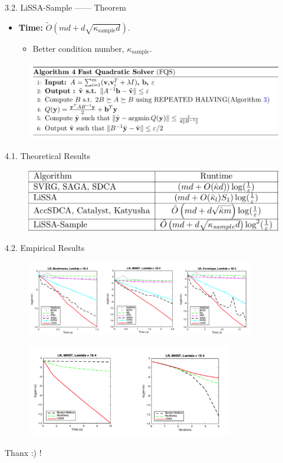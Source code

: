 \documentclass[pdf]{beamer}
\theoremstyle{remark}
\theoremstyle{definition}
\begin{document}
\begin{frame}{3.2. LiSSA-Sample —— Theorem}
\begin{itemize}
	\item \textbf{Time: }$\tilde{O}\left(m d+d \sqrt{\kappa_{\text {sample}}d}\right)$.
	\begin{itemize}
		\item Better condition number, $\kappa_{\text {sample}}$.
	\end{itemize}
\end{itemize}
\begin{figure}
	\includegraphics[scale=0.48]{fig/alg4.png}
\end{figure}
\end{frame}


\begin{frame}{4.1. Theoretical Results}

\begin{figure}
	\includegraphics[scale=0.58]{fig/result.png}
\end{figure}

\end{frame}

\begin{frame}{4.2. Empirical Results}

\begin{figure}
	\includegraphics[width = 10cm]{fig/fig2.png}
\end{figure}
\begin{figure}
	\includegraphics[width = 9cm]{fig/fig3.png}
\end{figure}
\end{frame}


\begin{frame}{}
Thanx  :) !
\end{frame}
\end{document}

